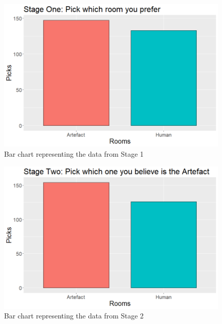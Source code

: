 \begin{figure}[!ht]
    \includegraphics[width=\columnwidth]{./Images/stage-1-picks-graph.png}
    \centering
    \caption{Bar chart representing the data from Stage 1}
    \label{stage-1-graph}
\end{figure}

\begin{figure}[!ht]
    \includegraphics[width=\columnwidth]{./Images/stage-2-picks-graph.png}
    \centering
    \caption{Bar chart representing the data from Stage 2}
    \label{stage-2-graph}
\end{figure}